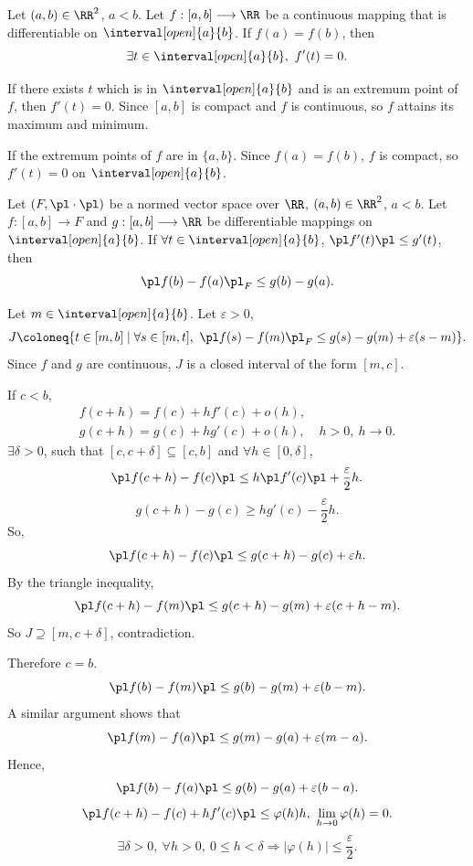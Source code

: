 \begin{theoremenv}[Rolle]
    Let $(a,b)\in \RR^2$, $a<b$. Let $f:[a,b]\longrightarrow \RR$ be a continuous mapping that is differentiable on $\interval[open]{a}{b}$. If $f(a)=f(b)$, then
    $$\exists t\in \interval[open]{a}{b},\ f'(t)=0.$$
    
\end{theoremenv}
\begin{proofenv}
    If there exists $t$ which is in $\interval[open]{a}{b}$ and is an extremum point of $f$, then $f'(t)=0$.
    Since $[a,b]$ is compact and $f$ is continuous, so $f$ attains its maximum and minimum.
    
    \quad If the extremum points of $f$ are in $\{a,b\}$. Since $f(a)=f(b)$, $f$ is compact, so $f'(t)=0$ on $\interval[open]{a}{b}$.
\end{proofenv}
\begin{theoremenv}
    Let $(F,\pl\cdot\pl)$ be a normed vector space over $\RR$, $(a,b)\in \RR^2$, $a<b$. Let $f:[a,b] \longrightarrow F$ and $g:[a,b]\longrightarrow \RR$ be differentiable mappings on $\interval[open]{a}{b}$.
    If $\forall t\in \interval[open]{a}{b}$, $\pl f'(t)\pl \le g'(t)$, then 
    $$\pl f(b)-f(a)\pl_F\le g(b)-g(a).$$ 
\end{theoremenv}
\begin{proofenv}
    Let $m\in \interval[open]{a}{b}$. Let $\varepsilon>0$, 
    $$J\coloneq\{t\in[m,b]\mid \forall s\in [m,t],\ \pl f(s)-f(m)\pl_F\le g(s)-g(m)+\varepsilon(s-m)\}.$$
    Since $f$ and $g$ are continuous, $J$ is a closed interval of the form $[m,c]$.
    
    If $c<b$, 
    $$\begin{array}{rl}
        f(c+h)=f(c)+hf'(c)+o(h),&\\
        g(c+h)=g(c)+hg'(c)+o(h),&\ h>0,\ h\rightarrow 0.
    \end{array}$$
    $\exists \delta>0$, such that $[c,c+\delta]\subseteq [c,b]$ and $\forall h\in [0,\delta]$,
    $$\pl f(c+h)-f(c)\pl \le h\pl f'(c)\pl+ \frac{\varepsilon}{2}h.$$
    $$g(c+h)-g(c)\ge hg'(c)-\frac{\varepsilon}{2}h.$$
    So, 
    $$\pl f(c+h)-f(c)\pl\le g(c+h)-g(c)+\varepsilon h.$$
    By the triangle inequality,
    $$\pl f(c+h)-f(m)\pl\le g(c+h)-g(m)+\varepsilon(c+h-m).$$
    So $J\supseteq [m,c+\delta]$, contradiction.

    Therefore $c=b$.
    $$\pl f(b)-f(m)\pl\le g(b)-g(m)+\varepsilon(b-m).$$
    A similar argument shows that
    $$\pl f(m)-f(a)\pl\le g(m)-g(a)+\varepsilon(m-a).$$
    Hence,
    $$\pl f(b)-f(a)\pl\le g(b)-g(a)+\varepsilon(b-a).$$
    $$\pl f(c+h) -f(c) + h f'(c)\pl \le \varphi(h)h,\ \lim_{h\rightarrow 0}\varphi(h)=0.$$
    $$\exists \delta>0,\ \forall h>0,\ 0\le h< \delta\Rightarrow \left| \varphi(h)\right|\le \frac{\varepsilon}{2}.$$
\end{proofenv}
